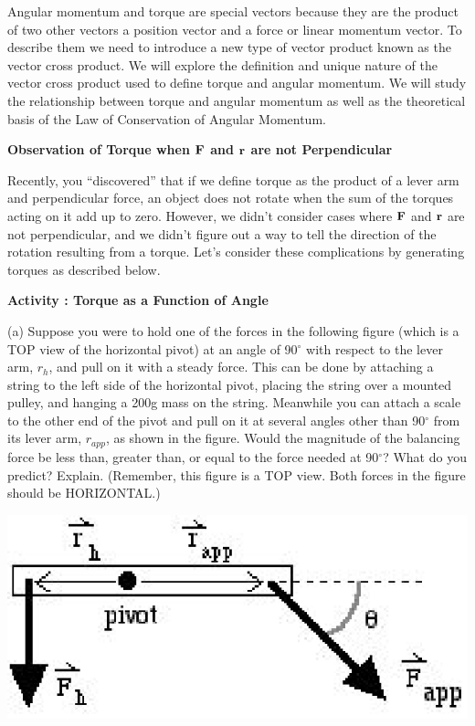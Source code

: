 Angular momentum and torque are special vectors because they are the product
of two other vectors a position vector and a force or linear momentum vector.
To describe them we need to introduce a new type of vector product known as
the vector cross product. We will explore the definition and unique nature of
the vector cross product used to define torque and angular momentum. We will
study the relationship between torque and angular momentum as well as the theoretical
basis of the Law of Conservation of Angular Momentum.

\textbf{Observation of Torque when \( {\bf F} \) and \( {\bf r} \)
are not Perpendicular} 

Recently, you ``discovered'' that if we define torque as the
product of a lever arm and perpendicular force, an object does not rotate when
the sum of the torques acting on it add up to zero. However, we didn't consider
cases where \textbf{\( {\bf F} \)} and \textbf{\( {\bf r} \)}
are not perpendicular, and we didn't figure out a way to tell the direction
of the rotation resulting from a torque. Let's consider these complications
by generating torques as described below.

\textbf{Activity  : Torque as a Function of Angle} 

(a) Suppose you were to hold one of the forces in the following figure (which is a TOP view of the horizontal pivot) at an angle of 90\( ^{\circ } \)
with respect to the lever arm, \( r_{h} \), and pull on it with a steady force.
This can be done by attaching a string to the left side of the horizontal pivot, placing the string over a mounted pulley, and hanging a 200g mass on the string. Meanwhile you can attach a scale to the other end of the pivot and pull on it at several angles other than 90\( ^{\circ } \)
from its lever arm, \( r_{app} \), as shown in the figure. Would the magnitude of the balancing force be less than, greater than, or equal to the force needed at 90\( ^{\circ } \)? What do you predict? Explain. (Remember, this figure is a TOP view. Both forces in the figure should be HORIZONTAL.)

\vspace{0.3cm}
{\par\raggedright \includegraphics{ang_mom/ang_mom_fig1.eps} \par}
\vspace{0.3cm}

